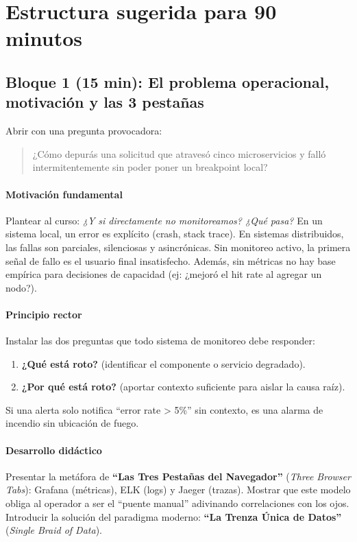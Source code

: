 \documentclass[variant=docente,cover=institutional,mode=screen]{ua-engineering-v6-article}
\begin{document}
\section{Estructura sugerida para 90 minutos}

\subsection*{Bloque 1 (15 min): El problema operacional, motivación y las 3 pestañas}
Abrir con una pregunta provocadora:
\begin{quote}
¿Cómo depurás una solicitud que atravesó cinco microservicios y falló intermitentemente sin poder poner un breakpoint local?
\end{quote}

\paragraph{Motivación fundamental}
Plantear al curso: \emph{¿Y si directamente no monitoreamos? ¿Qué pasa?}
En un sistema local, un error es explícito (crash, stack trace). En sistemas distribuidos, las fallas son parciales, silenciosas y asincrónicas. Sin monitoreo activo, la primera señal de fallo es el usuario final insatisfecho. Además, sin métricas no hay base empírica para decisiones de capacidad (ej: ¿mejoró el hit rate al agregar un nodo?).

\paragraph{Principio rector}
Instalar las dos preguntas que todo sistema de monitoreo debe responder:
\begin{enumerate}
\item \textbf{¿Qué está roto?} (identificar el componente o servicio degradado).
\item \textbf{¿Por qué está roto?} (aportar contexto suficiente para aislar la causa raíz).
\end{enumerate}
Si una alerta solo notifica ``error rate > 5\%'' sin contexto, es una alarma de incendio sin ubicación de fuego.

\paragraph{Desarrollo didáctico}
Presentar la metáfora de \textbf{``Las Tres Pestañas del Navegador''} (\emph{Three Browser Tabs}): Grafana (métricas), ELK (logs) y Jaeger (trazas). Mostrar que este modelo obliga al operador a ser el ``puente manual'' adivinando correlaciones con los ojos. Introducir la solución del paradigma moderno: \textbf{``La Trenza Única de Datos''} (\emph{Single Braid of Data}).
\end{document}
